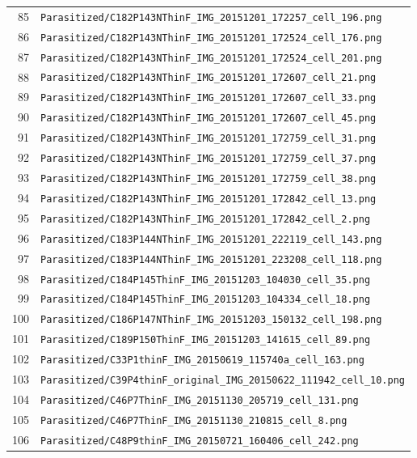 \begin{longtable}{r p{12cm}}
85 & \texttt{Parasitized/C182P143NThinF\_IMG\_20151201\_172257\_cell\_196.png} \\
86 & \texttt{Parasitized/C182P143NThinF\_IMG\_20151201\_172524\_cell\_176.png} \\
87 & \texttt{Parasitized/C182P143NThinF\_IMG\_20151201\_172524\_cell\_201.png} \\
88 & \texttt{Parasitized/C182P143NThinF\_IMG\_20151201\_172607\_cell\_21.png} \\
89 & \texttt{Parasitized/C182P143NThinF\_IMG\_20151201\_172607\_cell\_33.png} \\
90 & \texttt{Parasitized/C182P143NThinF\_IMG\_20151201\_172607\_cell\_45.png} \\
91 & \texttt{Parasitized/C182P143NThinF\_IMG\_20151201\_172759\_cell\_31.png} \\
92 & \texttt{Parasitized/C182P143NThinF\_IMG\_20151201\_172759\_cell\_37.png} \\
93 & \texttt{Parasitized/C182P143NThinF\_IMG\_20151201\_172759\_cell\_38.png} \\
94 & \texttt{Parasitized/C182P143NThinF\_IMG\_20151201\_172842\_cell\_13.png} \\
95 & \texttt{Parasitized/C182P143NThinF\_IMG\_20151201\_172842\_cell\_2.png} \\
96 & \texttt{Parasitized/C183P144NThinF\_IMG\_20151201\_222119\_cell\_143.png} \\
97 & \texttt{Parasitized/C183P144NThinF\_IMG\_20151201\_223208\_cell\_118.png} \\
98 & \texttt{Parasitized/C184P145ThinF\_IMG\_20151203\_104030\_cell\_35.png} \\
99 & \texttt{Parasitized/C184P145ThinF\_IMG\_20151203\_104334\_cell\_18.png} \\
100 & \texttt{Parasitized/C186P147NThinF\_IMG\_20151203\_150132\_cell\_198.png} \\
101 & \texttt{Parasitized/C189P150ThinF\_IMG\_20151203\_141615\_cell\_89.png} \\
102 & \texttt{Parasitized/C33P1thinF\_IMG\_20150619\_115740a\_cell\_163.png} \\
103 & \texttt{Parasitized/C39P4thinF\_original\_IMG\_20150622\_111942\_cell\_10.png} \\
104 & \texttt{Parasitized/C46P7ThinF\_IMG\_20151130\_205719\_cell\_131.png} \\
105 & \texttt{Parasitized/C46P7ThinF\_IMG\_20151130\_210815\_cell\_8.png} \\
106 & \texttt{Parasitized/C48P9thinF\_IMG\_20150721\_160406\_cell\_242.png} \\

\end{longtable}
